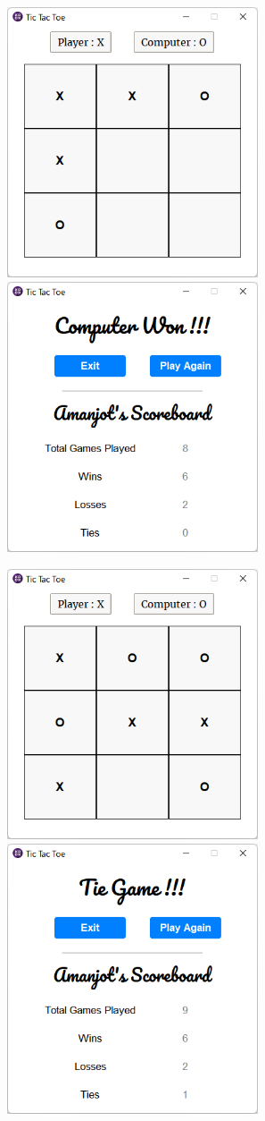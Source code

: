 \includegraphics[height=8cm, width=8cm]{figures/GameBoard_page3.png}
\hfill
\includegraphics[height=8cm, width=8cm]{figures/Result_page_computer_win.png}

\vspace{15pt}
\includegraphics[height=8cm, width=8cm]{figures/GameBoard_page_tie.png}
\hfill
\includegraphics[height=8cm, width=8cm]{figures/Result_page_tie.png}
